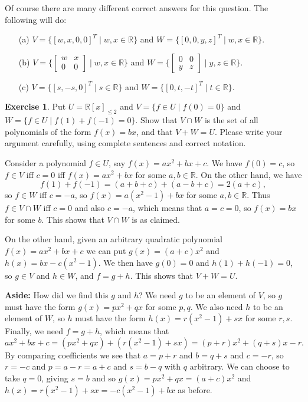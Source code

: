 \documentclass{amsart}
\newcommand{\R}         {{\mathbb{R}}}
\newcommand{\bsm}       {\left[\begin{smallmatrix}}
\newcommand{\esm}       {\end{smallmatrix}\right]}
\newcommand{\st}        {\;|\;}
\renewcommand{\:}       {\colon}
\theoremstyle{definition}
\newtheorem{exercise}{Exercise}[section]
\renewenvironment{solution}{\SolutionAtEnd}{\endSolutionAtEnd}
\begin{document}
\begin{solution}
 Of course there are many different correct answers for this
 question.  The following will do:
 \begin{itemize}
  \item[(a)]
   $V=\{[w,x,0,0]^T\st w,x\in\R\}$ and 
   $W=\{[0,0,y,z]^T\st w,x\in\R\}$.
  \item[(b)]
   $V=\{\bsm w&x\\0&0\esm\st w,x\in\R\}$ and
   $W=\{\bsm 0&0\\y&z\esm\st y,z\in\R\}$.   
  \item[(c)]
   $V=\{[s,-s,0]^T\st s\in\R\}$ and
   $W=\{[0,t,-t]^T\st t\in\R\}$.
 \end{itemize}
\end{solution}

\begin{exercise}
 Put $U=\R[x]_{\leq 2}$ and $V=\{f\in U\st f(0)=0\}$ and
 $W=\{f\in U\st f(1)+f(-1)=0\}$.  Show that $V\cap W$ is the
 set of all polynomials of the form $f(x)=bx$, and that
 $V+W=U$.  Please write your argument carefully, using
 complete sentences and correct notation.
\end{exercise}
\begin{solution}
 Consider a polynomial $f\in U$, say $f(x)=ax^2+bx+c$.  We
 have $f(0)=c$, so $f\in V$ iff $c=0$ iff $f(x)=ax^2+bx$ for
 some $a,b\in\R$.  On the other hand, we have 
 \[ f(1) + f(-1) = (a+b+c) + (a-b+c) = 2(a+c), \]
 so $f\in W$ iff $c=-a$, so $f(x)=a(x^2-1)+bx$ for some
 $a,b\in\R$.  Thus $f\in V\cap W$ iff $c=0$ and also $c=-a$,
 which means that $a=c=0$, so $f(x)=bx$ for some $b$.  This
 shows that $V\cap W$ is as claimed.

 On the other hand, given an arbitrary quadratic polynomial
 $f(x)=ax^2+bx+c$ we can put $g(x)=(a+c)x^2$ and
 $h(x)=bx-c(x^2-1)$.  We then have $g(0)=0$ and
 $h(1)+h(-1)=0$, so $g\in V$ and $h\in W$, and $f=g+h$.
 This shows that $V+W=U$.

 \textbf{Aside:} 
 How did we find this $g$ and $h$?  We need $g$ to be an element of
 $V$, so $g$ must have the form $g(x)=px^2+qx$ for some $p,q$.  We
 also need $h$ to be an element of $W$, so $h$ must have the form
 $h(x)=r(x^2-1)+sx$ for some $r,s$.  Finally, we need $f=g+h$, which
 means that 
 \[ ax^2+bx+c = (px^2+qx)+(r(x^2-1)+sx) 
     = (p+r)x^2 + (q+s)x - r.
 \] 
 By comparing coefficients we see that $a=p+r$ and $b=q+s$ and $c=-r$,
 so $r=-c$ and $p=a-r=a+c$ and $s=b-q$ with $q$ arbitrary.  We can
 choose to take $q=0$, giving $s=b$ and so $g(x)=px^2+qx=(a+c)x^2$ and
 $h(x)=r(x^2-1)+sx=-c(x^2-1)+bx$ as before.
\end{solution}
\end{document}
